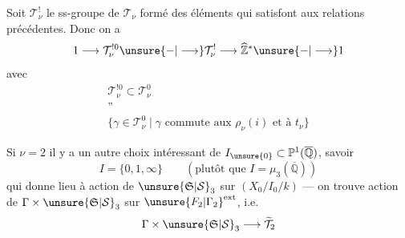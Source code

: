 Soit $\mathcal T_\nu^!$ le ss-groupe de $\mathcal T_\nu$
formé des éléments qui satisfont
aux relations précédentes. Donc on a
\[
1\longrightarrow\mathcal T_\nu^{!0}\unsure{-|\longrightarrow}\mathcal T_\nu^!\longrightarrow\widehat{\mathbb Z}^{*}\unsure{-|\longrightarrow}1
\]
avec
\[
\begin{gathered}
\mathcal T_\nu^{!0}\subset\mathcal T_\nu^0\\
\text{''}\\
\{\gamma\in\mathcal T_\nu^0\mid\gamma\text{ commute aux }\rho_\nu(i)
\text{ et à }t_\nu\}
\end{gathered}
\]

Si $\nu=2$ il y a un autre choix
intéressant de $I_{\unsure{0}}\subset\mathbb P^1(\overline{\mathbb Q})$, savoir
\[
I=\{0,1,\infty\}\qquad(\text{plutôt que }I=\mu_3(\overline{\mathbb Q}))
\]
qui donne lieu à action de
$\unsure{\mathfrak S|\mathcal S}_3$ sur $(X_0/I_0/k)$ --- on trouve
action de $\Gamma\times\unsure{\mathfrak S|\mathcal S}_3$ sur $\unsure{F_2|\Gamma_2}^{\mathrm{ext}}$, i.e.
\[
\Gamma\times\unsure{\mathfrak S|\mathcal S}_3\longrightarrow\widetilde{\mathcal T}_2
\]

